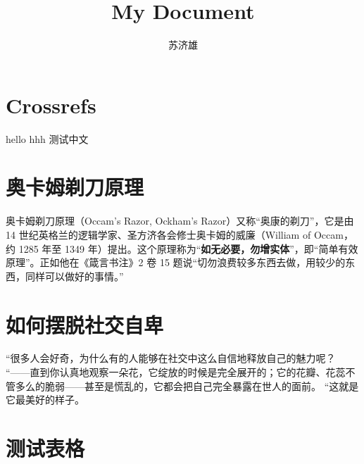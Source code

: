 \documentclass[
  a4paper,
]{article}
\title{My Document}
\author{苏济雄}
\date{}
\renewcommand*\contentsname{Table of contents}
\newcommand\contentsname{Table of contents}
\begin{document}
\maketitle
\ifdefined\Shaded\renewenvironment{Shaded}{\begin{tcolorbox}[boxrule=0pt, enhanced, colback={shadecolor}, frame hidden, breakable]}{\end{tcolorbox}}\fi

\renewcommand*\contentsname{Contents}
{
\hypersetup{linkcolor=}
\setcounter{tocdepth}{2}
\tableofcontents
}
\hypertarget{crossrefs}{%
\section{Crossrefs}\label{crossrefs}}

hello \cite{sevastre2022intracellular} hhh \cite{kucera2020prostate}
测试中文 \cite{董文鸳2011我国谷歌学术搜索研究综述}

\hypertarget{ux5965ux5361ux59c6ux5243ux5200ux539fux7406}{%
\section{奥卡姆剃刀原理}\label{ux5965ux5361ux59c6ux5243ux5200ux539fux7406}}

奥卡姆剃刀原理（Occam's Razor, Ockham's
Razor）又称``奥康的剃刀''，它是由 14
世纪英格兰的逻辑学家、圣方济各会修士奥卡姆的威廉（William of Occam，约
1285 年至 1349
年）提出。这个原理称为``\textbf{如无必要，勿增实体}''，即``简单有效原理''。正如他在《箴言书注》2
卷 15 题说``切勿浪费较多东西去做，用较少的东西，同样可以做好的事情。''

\hypertarget{ux5982ux4f55ux6446ux8131ux793eux4ea4ux81eaux5351}{%
\section{如何摆脱社交自卑}\label{ux5982ux4f55ux6446ux8131ux793eux4ea4ux81eaux5351}}

``很多人会好奇，为什么有的人能够在社交中这么自信地释放自己的魅力呢？
``------直到你认真地观察一朵花，它绽放的时候是完全展开的；它的花瓣、花蕊不管多么的脆弱------甚至是慌乱的，它都会把自己完全暴露在世人的面前。
``这就是它最美好的样子。

\hypertarget{ux6d4bux8bd5ux8868ux683c}{%
\section{测试表格}\label{ux6d4bux8bd5ux8868ux683c}}
\end{document}
